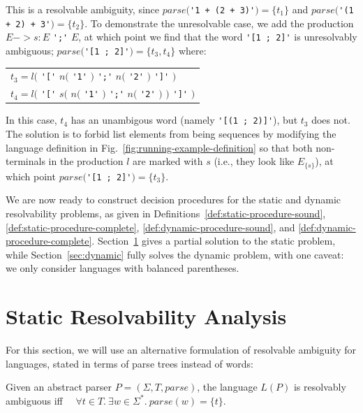 \documentclass[runningheads]{llncs}
\newcommand{\T}{\Sigma} %
\newcommand{\parse}{\mathit{parse}} %
\begin{document}
\noindent This is a resolvable ambiguity, since $\parse($\verb|'1 + (2 + 3)'|$) = \{t_1\}$ and $\parse($\verb|'(1 + 2) + 3'|$) = \{t_2\}$. To demonstrate the unresolvable case, we add the production $E -> s: E$ \verb|';'| $E$, at which point we find that the word \verb|'[1 ; 2]'| is unresolvably ambiguous; $\parse($\verb|'[1 ; 2]'|$) = \{t_3, t_4\}$ where:

\begin{center}
  \begin{tabular}{l}
    $t_3 = l($ \verb|'['| \hphantom{$s($} $n($ \verb|'1'| $)$ \verb|';'| $n($ \verb|'2'| $)$ \hphantom{$)$} \verb|']'| $)$ \\
    $t_4 = l($ \verb|'['| $s($ $n($ \verb|'1'| $)$ \verb|';'| $n($ \verb|'2'| $)$ $)$ \verb|']'| $)$ \\
  \end{tabular}
\end{center}

\noindent In this case, $t_4$ has an unambigous word (namely \verb|'[(1 ; 2)]'|), but $t_3$ does not. The solution is to forbid list elements from being sequences by modifying the language definition in Fig.~\ref{fig:running-example-definition} so that both non-terminals in the production $l$ are marked with $s$ (i.e., they look like $E_{\{s\}}$), at which point $\parse($\verb|'[1 ; 2]'|$) = \{t_3\}$.

We are now ready to construct decision procedures for the static and dynamic resolvability problems, as given in Definitions~\ref{def:static-procedure-sound}, \ref{def:static-procedure-complete}, \ref{def:dynamic-procedure-sound}, and \ref{def:dynamic-procedure-complete}. Section~\ref{sec:static} gives a partial solution to the static problem, while Section~\ref{sec:dynamic} fully solves the dynamic problem, with one caveat: we only consider languages with balanced parentheses.

\section{Static Resolvability Analysis} \label{sec:static}

For this section, we will use an alternative formulation of resolvable ambiguity for languages, stated in terms of parse trees instead of words:

\begin{lemma}
  Given an abstract parser $P = (\T, T, \parse)$, the language $L(P)$ is resolvably ambiguous iff $\quad\forall t \in T.\ \exists w \in \T^{*}.\ \parse(w) = \{t\}$.
\end{lemma}
\end{document}
